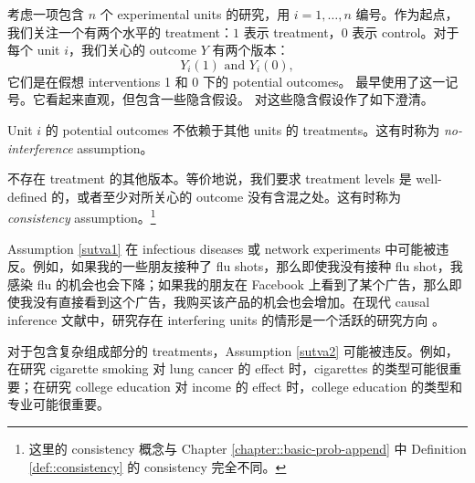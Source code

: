 考虑一项包含 $n$ 个 experimental units 的研究，用 $i= 1, \ldots, n$ 编号。作为起点，我们关注一个有两个水平的 treatment：$1$ 表示 treatment，$0$ 表示 control。对于每个 unit $i$，我们关心的 outcome $Y$ 有两个版本：
$$
Y_i(1)  \text{ and } Y_i(0),
$$ 
它们是在假想 interventions 1 和 0 下的 potential outcomes。
\citet{Neyman:1923} 最早使用了这一记号。它看起来直观，但包含一些隐含假设。\citet{Rubin:1980} 对这些隐含假设作了如下澄清。

\begin{assumption}
[no interference]
\label{sutva1}
Unit $i$ 的 potential outcomes 不依赖于其他 units 的 treatments。这有时称为 {\it no-interference} assumption。
\end{assumption}


\begin{assumption}
[consistency]
\label{sutva2}
不存在 treatment 的其他版本。等价地说，我们要求 treatment levels 是 well-defined 的，或者至少对所关心的 outcome 没有含混之处。这有时称为 {\it consistency} assumption。\footnote{这里的 consistency 概念与 Chapter \ref{chapter::basic-prob-append} 中 Definition \ref{def::consistency} 的 consistency 完全不同。}
\end{assumption}


%
%

Assumption \ref{sutva1} 在 infectious diseases 或 network experiments 中可能被违反。例如，如果我的一些朋友接种了 flu shots，那么即使我没有接种 flu shot，我感染 flu 的机会也会下降；如果我的朋友在 Facebook 上看到了某个广告，那么即使我没有直接看到这个广告，我购买该产品的机会也会增加。在现代 causal inference 文献中，研究存在 interfering units 的情形是一个活跃的研究方向 \citep[e.g.,][]{hudgens2008toward}。


对于包含复杂组成部分的 treatments，Assumption \ref{sutva2} 可能被违反。例如，在研究 cigarette smoking 对 lung cancer 的 effect 时，cigarettes 的类型可能很重要；在研究 college education 对 income 的 effect 时，college education 的类型和专业可能很重要。


